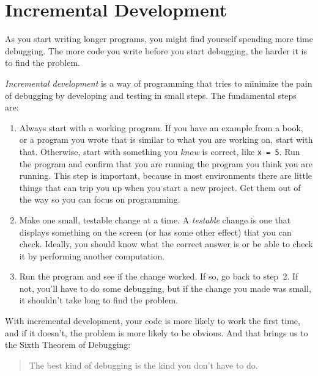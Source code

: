 \section{Incremental Development}


As you start writing longer programs, you might find yourself spending more time debugging.
The more code you write before you start debugging, the harder it is to find
the problem.

\emph{Incremental development} is a way of programming that tries
to minimize the pain of debugging by developing and testing in small steps.  The fundamental steps are:

\begin{enumerate}

\item Always start with a working program.  If you have an
example from a book, or a program you wrote that is similar to
what you are working on, start with that.  Otherwise, start with
something you \emph{know} \linebreak is correct, like \lstinline{x = 5}.  Run the program
and confirm that you are running the program you think you are
running.
This step is important, because in most environments there
are little things that can trip you up when you start a new
project.  Get them out of the way so you can focus on programming.

\item Make one small, testable change at a time.  A \emph{testable}
change is one that displays something on the screen (or has some
other effect) that you can check.  Ideally, you should know what
the correct answer is or be able to check it by performing another
computation.

\item Run the program and see if the change worked.  If so, go back
to step~2.  If not, you'll have to do some debugging, but if the
change you made was small, it shouldn't take long to find the problem.

\end{enumerate}


With incremental development, your code is more likely to work the first time, and if it doesn't, the problem is more likely to be obvious.  And that brings us to the Sixth Theorem of Debugging:

\begin{quote}
The best kind of debugging is the kind you don't have to do.
\end{quote}

